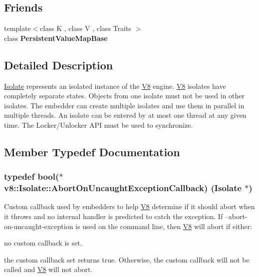 \subsection*{Friends}
\begin{DoxyCompactItemize}
\item 
{\footnotesize template$<$class K , class V , class Traits $>$ }\\class {\bfseries Persistent\+Value\+Map\+Base}\hypertarget{classv8_1_1Isolate_a08e2b8f164392d71811ce6cc134f33e3}{}\label{classv8_1_1Isolate_a08e2b8f164392d71811ce6cc134f33e3}

\end{DoxyCompactItemize}


\subsection{Detailed Description}
\hyperlink{classv8_1_1Isolate}{Isolate} represents an isolated instance of the \hyperlink{classv8_1_1V8}{V8} engine. \hyperlink{classv8_1_1V8}{V8} isolates have completely separate states. Objects from one isolate must not be used in other isolates. The embedder can create multiple isolates and use them in parallel in multiple threads. An isolate can be entered by at most one thread at any given time. The Locker/\+Unlocker A\+PI must be used to synchronize. 

\subsection{Member Typedef Documentation}
\subsubsection[{\texorpdfstring{Abort\+On\+Uncaught\+Exception\+Callback}{AbortOnUncaughtExceptionCallback}}]{\setlength{\rightskip}{0pt plus 5cm}typedef bool($\ast$ v8\+::\+Isolate\+::\+Abort\+On\+Uncaught\+Exception\+Callback) ({\bf Isolate} $\ast$)}\hypertarget{classv8_1_1Isolate_aeb1d49e500d9521b42743a6a740271e2}{}\label{classv8_1_1Isolate_aeb1d49e500d9521b42743a6a740271e2}
Custom callback used by embedders to help \hyperlink{classv8_1_1V8}{V8} determine if it should abort when it throws and no internal handler is predicted to catch the exception. If --abort-\/on-\/uncaught-\/exception is used on the command line, then \hyperlink{classv8_1_1V8}{V8} will abort if either\+:
\begin{DoxyItemize}
\item no custom callback is set.
\item the custom callback set returns true. Otherwise, the custom callback will not be called and \hyperlink{classv8_1_1V8}{V8} will not abort. 
\end{DoxyItemize}

